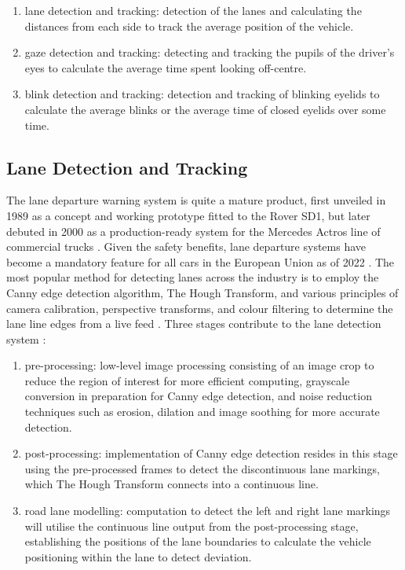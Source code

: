 \documentclass[10pt,conference]{IEEEtran}
\begin{document}
\begin{enumerate}[label=\alph*.]
    \item lane detection and tracking: detection of the lanes and calculating the distances from each side to track the average position of the vehicle.
    \item gaze detection and tracking: detecting and tracking the pupils of the driver's eyes to calculate the average time spent looking off-centre.
    \item blink detection and tracking: detection and tracking of blinking eyelids to calculate the average blinks or the average time of closed eyelids over some time.
\end{enumerate}

\subsection{Lane Detection and Tracking}

The lane departure warning system is quite a mature product, first unveiled in 1989 as a concept and working prototype fitted to the Rover SD1, but later debuted in 2000 as a production-ready system for the Mercedes Actros line of commercial trucks \cite{b1}. Given the safety benefits, lane departure systems have become a mandatory feature for all cars in the European Union as of 2022 \cite{b1}\cite{b2}. The most popular method for detecting lanes across the industry is to employ the Canny edge detection algorithm, The Hough Transform, and various principles of camera calibration, perspective transforms, and colour filtering to determine the lane line edges from a live feed \cite{b1}. Three stages contribute to the lane detection system \cite{b3}:

\begin{enumerate}[label=\alph*.]
    \item pre-processing: low-level image processing consisting of an image crop to reduce the region of interest for more efficient computing, grayscale conversion in preparation for Canny edge detection, and noise reduction techniques such as erosion, dilation and image soothing for more accurate detection.
    \item post-processing: implementation of Canny edge detection resides in this stage using the pre-processed frames to detect the discontinuous lane markings, which The Hough Transform connects into a continuous line.
    \item road lane modelling: computation to detect the left and right lane markings will utilise the continuous line output from the post-processing stage, establishing the positions of the lane boundaries to calculate the vehicle positioning within the lane to detect deviation.
\end{enumerate}
\end{document}
